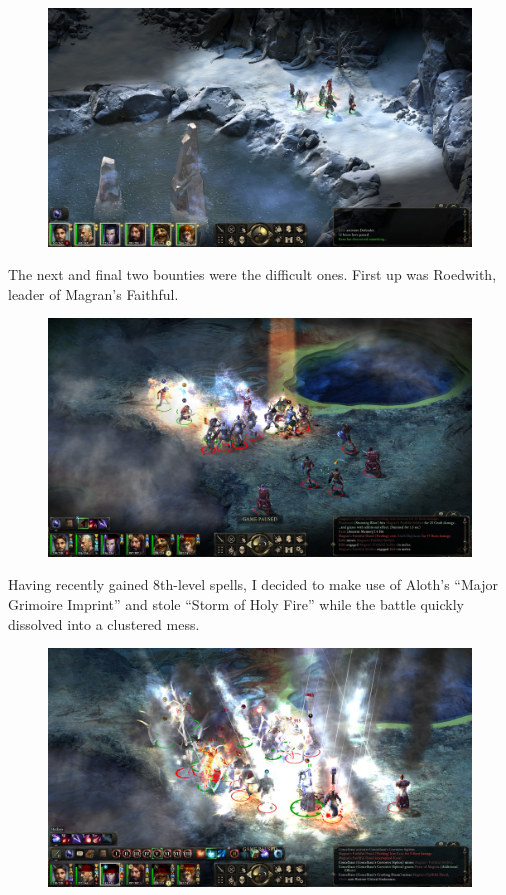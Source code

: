 \documentclass{article}
\begin{document}
\begin{figure}
\includegraphics[scale=0.33]{files/blog/2020_01_18_poe_potd_wmpt2/2020_01_18_whitestone.jpg}
\end{figure}

The next and final two bounties were the difficult ones.  First up was Roedwith, leader of Magran's Faithful.

\begin{figure}
\includegraphics[scale=0.33]{files/blog/2020_01_18_poe_potd_wmpt2/2020_01_18_bounty3_1.jpg}
\end{figure}

Having recently gained 8th-level spells, I decided to make use of Aloth's ``Major Grimoire Imprint'' and stole ``Storm of Holy Fire'' while the battle quickly dissolved into a clustered mess.

\begin{figure}
\includegraphics[scale=0.33]{files/blog/2020_01_18_poe_potd_wmpt2/2020_01_18_bounty3_2.jpg}
\end{figure}
\end{document}
